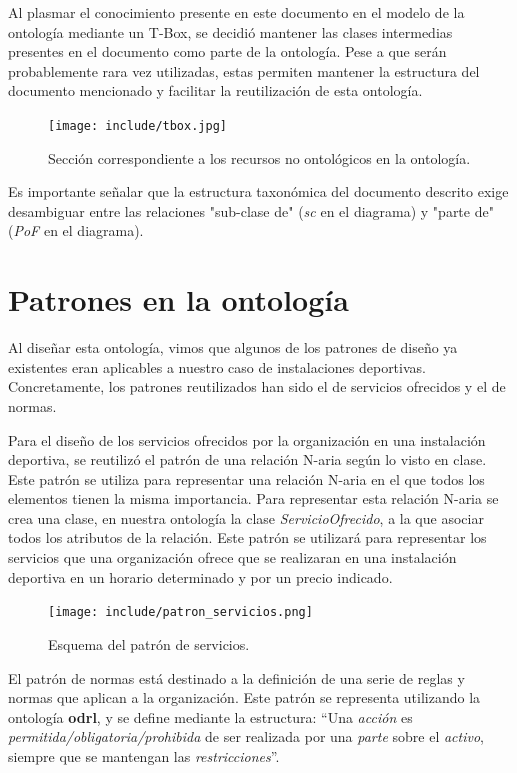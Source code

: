 \documentclass[a4paper,12pt]{article}
\begin{document}
	Al plasmar el conocimiento presente en este documento en el modelo de la ontología mediante un T-Box, se decidió mantener las clases intermedias presentes en el documento como parte de la ontología. Pese a que serán probablemente rara vez utilizadas, estas permiten mantener la estructura del documento mencionado y facilitar la reutilización de esta ontología. 
	
	\begin{figure}[H]
		\centering
		\texttt{[image: include/tbox.jpg]}
		\caption{Sección correspondiente a los recursos no ontológicos en la ontología.}
	\end{figure}
	
	Es importante señalar que la estructura taxonómica del documento descrito exige desambiguar entre las relaciones "sub-clase de" (\textit{sc} en el diagrama) y "parte de" (\textit{PoF} en el diagrama).
	
	\section{Patrones en la ontología}
	
	Al diseñar esta ontología, vimos que algunos de los patrones de diseño ya existentes eran aplicables a nuestro caso de instalaciones deportivas. Concretamente, los patrones reutilizados han sido el de servicios ofrecidos y el de normas.
	
	Para el diseño de los servicios ofrecidos por la organización en una instalación deportiva, se reutilizó el patrón de una relación N-aria según lo visto en clase. Este patrón se utiliza para representar una relación N-aria en el que todos los elementos tienen la misma importancia. Para representar esta relación N-aria se crea una clase, en nuestra ontología la clase \textit{ServicioOfrecido}, a la que asociar todos los atributos de la relación. Este patrón se utilizará para representar los servicios que una organización ofrece que se realizaran en una instalación deportiva en un horario determinado y por un precio indicado.
	
	\begin{figure}[H]
		\centering
		\texttt{[image: include/patron\_servicios.png]}
		\caption{Esquema del patrón de servicios.}
	\end{figure}

	El patrón de normas está destinado a la definición de una serie de reglas y normas que aplican a la organización. Este patrón se representa utilizando la ontología \textbf{odrl}, y se define mediante la estructura: “Una \textit{acción} es \textit{permitida/obligatoria/prohibida} de ser realizada por una \textit{parte} sobre el \textit{activo}, siempre que se mantengan las \textit{restricciones}”.
	
\end{document}
